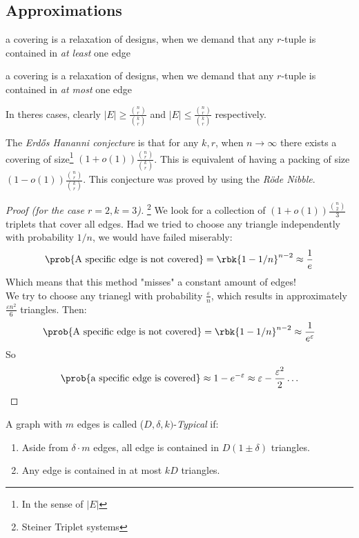 \documentclass[a4paper, 11pt, oneside]{book}
\begin{document}
\subsection{Approximations}
\begin{yellowBox}
\begin{defn}
	[Covering] a covering is a relaxation of designs, when we demand that any $r$-tuple is contained in \emph{at least} one edge
\end{defn}	
\begin{defn}
	[Packing] a covering is a relaxation of designs, when we demand that any $r$-tuple is contained in \emph{at most} one edge
\end{defn}	
\end{yellowBox}
\begin{remark}
	In theres cases, clearly $|E| \ge \frac{{n\choose r}}{{k\choose r}}$ and $|E| \le \frac{{n\choose r}}{{k\choose r}}$ respectively.
\end{remark}
The \emph{Erd\H{o}s Hananni conjecture} is that for any $k,r$, when $n\to\infty$ there exists a covering of size\footnote{In the sense of $|E|$} $(1+o(1))\frac{{n\choose r}}{{k\choose r}}$. This is equivalent of having a packing of size $(1-o(1))\frac{{n\choose r}}{{k\choose r}}$. This conjecture was proved by using the \emph{R\"ode Nibble}.
\begin{proof}
	[Proof (for the case $r=2,k=3$)]\footnote{Steiner Triplet systems} We look for a collection of $(1+o(1))\frac{{n\choose 2}}{3}$ triplets that cover all edges. Had we tried to choose any triangle independently with probability $1/n$, we would have failed miserably: \[
	\prob{\text{A specific edge is not covered}} = \rbk{1-1/n}^{n-2}\approx \frac{1}{e}
	\]
	Which means that this method "misses" a constant amount of edges!\\
	We try to choose any trianegl with probability $\frac{\varepsilon}{n}$, which results in approximately $\frac{\varepsilon n^2}{6}$ triangles. Then:
	\[
		\prob{\text{A specific edge is not covered}} = \rbk{1-1/n}^{n-2}\approx \frac{1}{e^\varepsilon}
	\]
	So
	\[
	\prob{\text{a specific edge is covered}} \approx 1-e^{-\varepsilon} \approx\varepsilon - \frac{\varepsilon^2}{2}\ldots
	\]
\end{proof}
\begin{defn}
	 A graph with $m$ edges is called ($D,\delta,k)$-\emph{Typical} if:
	\begin{enumerate}
		\item Aside from $\delta\cdot m$ edges, all edge is contained in $D(1\pm\delta)$ triangles. 
		\item Any edge is contained in at most $kD$ triangles.
	\end{enumerate}
\end{defn}
\end{document}
